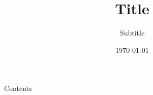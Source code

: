 \documentclass[ngerman,USenglish]{beamer} %
\title{Title}
\subtitle{Subtitle}
\author{\name\:\surname}
\date{\today}
\begin{document}
\begin{frame}
\maketitle
\end{frame}

\begin{frame}{Contents}
\tableofcontents
\end{frame}
\end{document}
